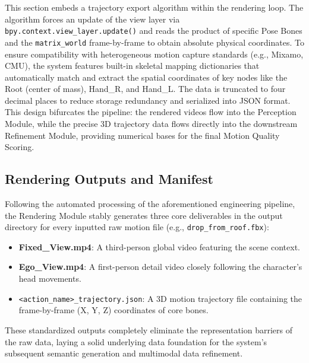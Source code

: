 \documentclass[11pt,oneside]{report}
\begin{document}
This section embeds a trajectory export algorithm within the rendering loop. The algorithm forces an update of the view layer via \texttt{bpy.context.view\_layer.update()} and reads the product of specific Pose Bones and the \texttt{matrix\_world} frame-by-frame to obtain absolute physical coordinates. To ensure compatibility with heterogeneous motion capture standards (e.g., Mixamo, CMU), the system features built-in skeletal mapping dictionaries that automatically match and extract the spatial coordinates of key nodes like the Root (center of mass), Hand\_R, and Hand\_L. The data is truncated to four decimal places to reduce storage redundancy and serialized into JSON format. This design bifurcates the pipeline: the rendered videos flow into the Perception Module, while the precise 3D trajectory data flows directly into the downstream Refinement Module, providing numerical bases for the final Motion Quality Scoring.

\subsection{Rendering Outputs and Manifest}
Following the automated processing of the aforementioned engineering pipeline, the Rendering Module stably generates three core deliverables in the output directory for every inputted raw motion file (e.g., \texttt{drop\_from\_roof.fbx}):

\begin{itemize}
    \item \textbf{Fixed\_View.mp4}: A third-person global video featuring the scene context.
    \item \textbf{Ego\_View.mp4}: A first-person detail video closely following the character's head movements.
    \item \texttt{\textless action\_name\textgreater \_trajectory.json}: A 3D motion trajectory file containing the frame-by-frame (X, Y, Z) coordinates of core bones.
\end{itemize}

These standardized outputs completely eliminate the representation barriers of the raw data, laying a solid underlying data foundation for the system's subsequent semantic generation and multimodal data refinement.
\end{document}
